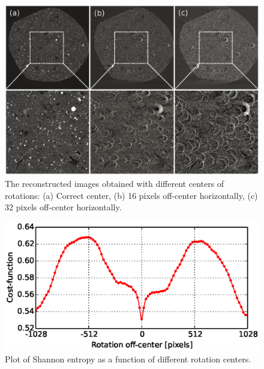 \documentclass[pdf]{iucr}              %
\begin{document}
\begin{figure}
\centering
\includegraphics[width=\textwidth]{figs/center_optimize.eps}
\caption{The reconstructed images obtained with different centers of rotations: (a) Correct center, (b) 16 pixels  off-center horizontally, (c) 32 pixels off-center horizontally.}
\label{fig:OptimizeCenter1}
\end{figure}

\begin{figure}
\centering
\includegraphics[width=\textwidth]{figs/center_costfunc.eps}
\caption{Plot of Shannon entropy as a function of different rotation centers. }
\label{fig:OptimizeCenter2}
\end{figure}

 
\end{document}
